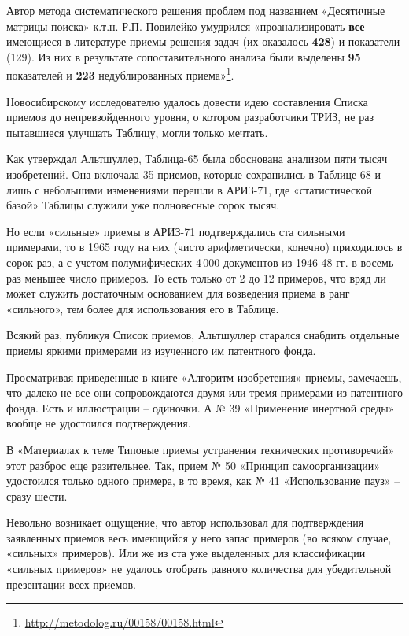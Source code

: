 \documentclass[11pt,a4paper]{article}
\begin{document}
Автор метода систематического решения проблем под названием «Десятичные
матрицы поиска» к.т.н. Р.П. Повилейко \cite{Povileiko1977} умудрился
«проанализировать \textbf{все} имеющиеся в литературе приемы решения задач (их
оказалось \textbf{428}) и показатели (129). Из них в результате
сопоставительного анализа были выделены \textbf{95} показателей и \textbf{223}
недублированных приема»\footnote{\url{http://metodolog.ru/00158/00158.html}}.

Новосибирскому исследователю удалось довести идею составления Списка приемов
до непревзойденного уровня, о котором разработчики ТРИЗ, не раз пытавшиеся
улучшать Таблицу, могли только мечтать.

Как утверждал Альтшуллер, Таблица-65 была обоснована анализом пяти тысяч
изобретений. Она включала 35 приемов, которые сохранились в Таблице-68 и лишь
с небольшими изменениями перешли в АРИЗ-71, где «статистической базой» Таблицы
служили уже полновесные сорок тысяч.

Но если «сильные» приемы в АРИЗ-71 подтверждались ста сильными примерами, то в
1965 году на них (чисто арифметически, конечно) приходилось в сорок раз, а с
учетом полумифических 4\,000 документов из 1946-48 гг. в восемь раз меньшее
число примеров. То есть только от 2 до 12 примеров, что вряд ли может служить
достаточным основанием для возведения приема в ранг «сильного», тем более для
использования его в Таблице.

Всякий раз, публикуя Список приемов, Альтшуллер старался снабдить отдельные
приемы яркими примерами из изученного им патентного фонда.

Просматривая приведенные в книге «Алгоритм изобретения» \cite{Altshuller1973}
приемы, замечаешь, что далеко не все они сопровождаются двумя или тремя
примерами из патентного фонда. Есть и иллюстрации -- одиночки. А № 39
«Применение инертной среды» вообще не удостоился подтверждения.

В «Материалах к теме Типовые приемы устранения технических противоречий»
\cite{Altshuller1973a} этот разброс еще разительнее. Так, прием № 50 «Принцип
самоорганизации» удостоился только одного примера, в то время, как № 41
«Использование пауз» -- сразу шести.

Невольно возникает ощущение, что автор использовал для подтверждения
заявленных приемов весь имеющийся у него запас примеров (во всяком случае,
«сильных» примеров). Или же из ста уже выделенных для классификации «сильных
примеров» не удалось отобрать равного количества для убедительной презентации
всех приемов.
\end{document}
